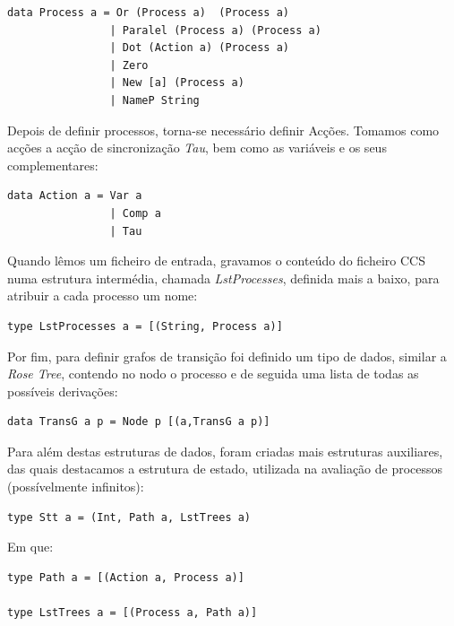 \begin{verbatim}
data Process a = Or (Process a)  (Process a)
                | Paralel (Process a) (Process a)
                | Dot (Action a) (Process a)
                | Zero 
                | New [a] (Process a)
                | NameP String
\end{verbatim}

Depois de definir processos, torna-se necessário definir Acções. Tomamos como acções a acção de sincronização \textit{Tau}, 
bem como as variáveis e os seus complementares:\\

\begin{verbatim}
data Action a = Var a 
                | Comp a 
                | Tau
\end{verbatim}

Quando lêmos um ficheiro de entrada, gravamos o conteúdo do ficheiro CCS numa estrutura intermédia, chamada \textit{LstProcesses}, 
definida mais a baixo, para atribuir a cada processo um nome:\\

\begin{verbatim}
type LstProcesses a = [(String, Process a)]
\end{verbatim}

Por fim, para definir grafos de transição foi definido um tipo de dados, similar a \textit{Rose Tree}, contendo no nodo 
o processo e de seguida uma lista de todas as possíveis derivações:\\

\begin{verbatim}
data TransG a p = Node p [(a,TransG a p)]
\end{verbatim}

Para além destas estruturas de dados, foram criadas mais estruturas auxiliares, das quais destacamos a estrutura de estado, 
utilizada na avaliação de processos (possívelmente infinitos):\\

\begin{verbatim}
type Stt a = (Int, Path a, LstTrees a)
\end{verbatim}

Em que:\\

\begin{verbatim}
type Path a = [(Action a, Process a)]

type LstTrees a = [(Process a, Path a)]
\end{verbatim}

